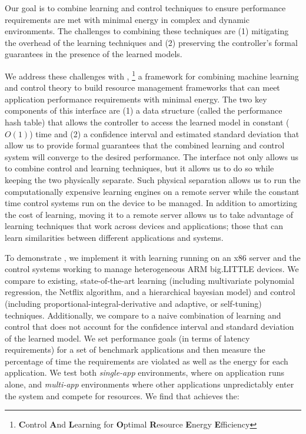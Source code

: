 Our goal is to combine learning and control techniques to ensure
performance requirements are met with minimal energy in complex and
dynamic environments.  The challenges to combining these techniques
are (1) mitigating the overhead of the learning techniques and (2)
preserving the controller's formal guarantees in the presence of the
learned models.

We address these challenges with \SYSTEM{}, \footnote{\textbf{C}ontrol
  \textbf{A}nd \textbf{L}earning for \textbf{O}ptimal
  \textbf{R}esource \textbf{E}nergy \textbf{E}fficiency} a framework
for combining machine learning and control theory to build resource
management frameworks that can meet application performance
requirements with minimal energy.  The two key components of this
interface are (1) a data structure (called the performance hash table)
that allows the controller to access the learned model in constant
($O(1)$) time and (2) a confidence interval and estimated standard
deviation that allow us to provide formal guarantees that the combined
learning and control system will converge to the desired performance.
The \SYSTEM{} interface not only allows us to combine control and
learning techniques, but it allows us to do so while keeping the two
physically separate.  Such physical separation allows us to run the
computationally expensive learning engines on a remote server while
the constant time control systems run on the device to be managed.  In
addition to amortizing the cost of learning, moving it to a remote
server allows us to take advantage of learning techniques that work
across devices and applications; \ie{} those that can learn
similarities between different applications and systems.


To demonstrate \SYSTEM{}, we implement it with learning running on an
x86 server and the control systems working to manage heterogeneous ARM
big.LITTLE devices.  We compare \SYSTEM{} to existing,
state-of-the-art learning (including multivariate polynomial
regression, the Netflix algorithm, and a hierarchical bayesian model)
and control (including proportional-integral-derivative and adaptive,
or self-tuning) techniques.  Additionally, we compare to a naive
combination of learning and control that does not account for the
confidence interval and standard deviation of the learned model.  We
set performance goals (in terms of latency requirements) for a set of
benchmark applications and then measure the percentage of time the
requirements are violated as well as the energy for each application.
We test both \emph{single-app} environments, where on application runs
alone, and \emph{multi-app} environments where other applications
unpredictably enter the system and compete for resources.  We find
that \SYSTEM{} achieves the:


